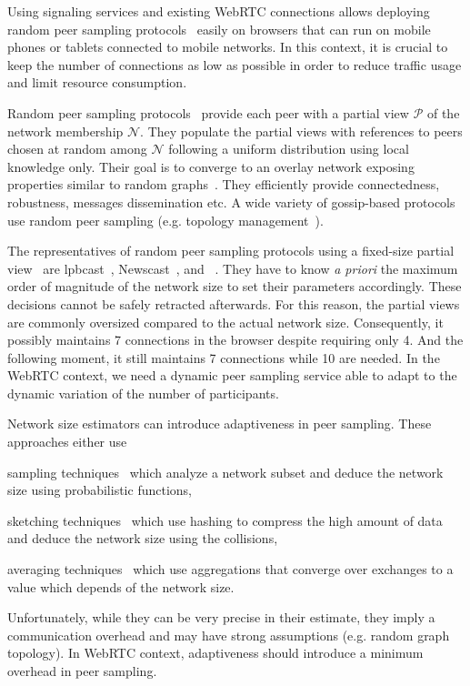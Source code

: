 Using signaling services and existing WebRTC connections allows deploying
random peer sampling protocols~\cite{jelasity2004peer} easily on browsers that
can run on mobile phones or tablets connected to mobile networks. In this
context, it is crucial to keep the number of connections as low as possible in
order to reduce traffic usage and limit resource consumption.

Random peer sampling protocols~\cite{jelasity2004peer} provide each
peer with a partial view $\mathcal{P}$ of the network membership
$\mathcal{N}$. They populate the partial views with references to
peers chosen at random among $\mathcal{N}$ following a uniform
distribution using local knowledge only. Their goal is to converge to
an overlay network exposing properties similar to random
graphs~\cite{erdos1959random}. They efficiently provide connectedness,
robustness, messages dissemination etc. A wide variety of gossip-based
protocols use random peer sampling (e.g. topology
management~\cite{voulgaris2005epidemic, jelasity2009tman,
  dabek2004vivaldi}).

The representatives of random peer sampling protocols using a fixed-size
partial view~\cite{jelasity2007gossip} are
lpbcast~\cite{eugster2003lightweight}, Newscast~\cite{tolgyeski2009adaptive},
and \CYCLON~\cite{voulgaris2005cyclon}. They have to know \emph{a priori} the
maximum order of magnitude of the network size to set their parameters
accordingly. These decisions cannot be safely retracted afterwards. For this
reason, the partial views are commonly oversized compared to the actual network
size. Consequently, it possibly maintains 7 connections in the browser despite
requiring only 4. And the following moment, it still maintains 7 connections
while 10 are needed. In the WebRTC context, we need a dynamic peer sampling
service able to adapt to the dynamic variation of the number of participants.

Network size estimators can introduce adaptiveness in peer sampling. These
approaches either use
\begin{inparaenum}[(i)]
\item sampling techniques~\cite{mane05network, ganesh2007peer,
    kostoulas2007active} which analyze a network subset and deduce the network
  size using probabilistic functions,
\item sketching techniques~\cite{flajolet2008hyperloglog, baquero2012extrema}
  which use hashing to compress the high amount of data and deduce the network
  size using the collisions,
\item averaging techniques~\cite{jelasity2004epidemic, blasa2011symmetric}
  which use aggregations that converge over exchanges to a value which depends
  of the network size.
\end{inparaenum}
Unfortunately, while they can be very precise in their estimate, they
imply a communication overhead and may have strong assumptions
(e.g. random graph topology). In WebRTC context, adaptiveness should
introduce a minimum overhead in peer sampling.

